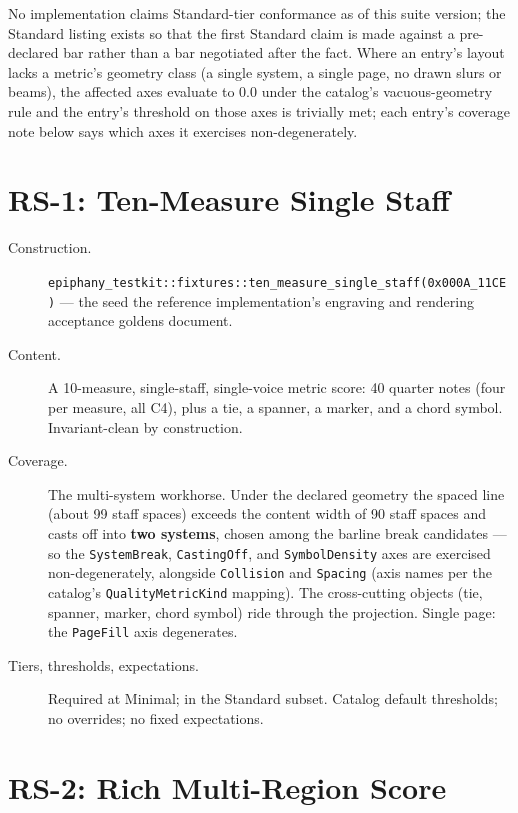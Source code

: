 \documentclass[11pt,letterpaper]{report}
\begin{document}
No implementation claims Standard-tier conformance as of this suite
version; the Standard listing exists so that the first Standard claim is
made against a pre-declared bar rather than a bar negotiated after the
fact. Where an entry's layout lacks a metric's geometry class (a single
system, a single page, no drawn slurs or beams), the affected axes
evaluate to $0.0$ under the catalog's vacuous-geometry rule and the
entry's threshold on those axes is trivially met; each entry's coverage
note below says which axes it exercises non-degenerately.

\section{RS-1: Ten-Measure Single Staff}
\label{sec:entries:rs1}

\begin{description}
  \item[Construction.]
    \texttt{epiphany\_testkit::fixtures::ten\_measure\_single\_staff(0x000A\_11CE)}
    --- the seed the reference implementation's engraving and rendering
    acceptance goldens document.
  \item[Content.] A 10-measure, single-staff, single-voice metric score:
    40 quarter notes (four per measure, all C4), plus a tie, a spanner, a
    marker, and a chord symbol. Invariant-clean by construction.
  \item[Coverage.] The multi-system workhorse. Under the declared
    geometry the spaced line (about 99 staff spaces) exceeds the content
    width of 90 staff spaces and casts off into \textbf{two systems},
    chosen among the barline break candidates --- so the
    \texttt{SystemBreak}, \texttt{CastingOff}, and
    \texttt{SymbolDensity} axes are exercised non-degenerately,
    alongside \texttt{Collision} and \texttt{Spacing} (axis names per
    the catalog's \texttt{QualityMetricKind} mapping). The
    cross-cutting objects (tie, spanner, marker, chord symbol) ride
    through the projection. Single page: the \texttt{PageFill} axis
    degenerates.
  \item[Tiers, thresholds, expectations.] Required at Minimal; in the
    Standard subset. Catalog default thresholds; no overrides; no fixed
    expectations.
\end{description}

\section{RS-2: Rich Multi-Region Score}
\label{sec:entries:rs2}
\end{document}
